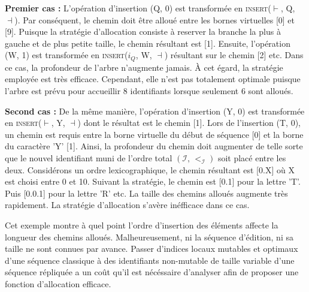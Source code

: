 \textbf{Premier cas :} L'opération d'insertion (Q, 0) est transformée en
\textsc{insert}($\vdash$, Q, $\dashv$). Par conséquent, le chemin doit être
alloué entre les bornes virtuelles [0] et [9]. Puisque la stratégie d'allocation
consiste à reserver la branche la plus à gauche et de plus petite taille, le
chemin résultant est [1]. Ensuite, l'opération (W, 1) est transformée en
\textsc{insert}($i_Q$, W, $\dashv$) résultant sur le chemin [2] etc.  Dans ce
cas, la profondeur de l'arbre n'augmente jamais. À cet égard, la stratégie
employée est très efficace. Cependant, elle n'est pas totalement optimale
puisque l'arbre est prévu pour accueillir 8 identifiants lorsque seulement 6
sont alloués.


\textbf{Second cas :} De la même manière, l'opération d'insertion (Y, 0) est
transformée en \textsc{insert}($\vdash$, Y, $\dashv$) dont le résultat est le
chemin [1]. Lors de l'insertion (T, 0), un chemin est requis entre la borne
virtuelle du début de séquence [0] et la borne du caractère 'Y' [1]. Ainsi, la
profondeur du chemin doit augmenter de telle sorte que le nouvel identifiant
muni de l'ordre total $(\mathcal{I},\,<_\mathcal{I})$ soit placé entre les
deux. Considérons un ordre lexicographique, le chemin résultant est [0.X] où X
est choisi entre 0 et 10. Suivant la stratégie, le chemin est [0.1] pour la
lettre 'T'. Puis [0.0.1] pour la lettre 'R' etc. La taille des chemins alloués
augmente très rapidement.  La stratégie d'allocation s'avère inéfficace dans ce
cas.

Cet exemple montre à quel point l'ordre d'insertion des éléments affecte la
longueur des chemins alloués. Malheureusement, ni la séquence d'édition, ni sa
taille ne sont connues par avance.  Passer d'indices locaux mutables et optimaux
d'une séquence classique à des identifiants non-mutable de taille variable d'une
séquence répliquée a un coût qu'il est nécéssaire d'analyser afin de proposer
une fonction d'allocation efficace.


